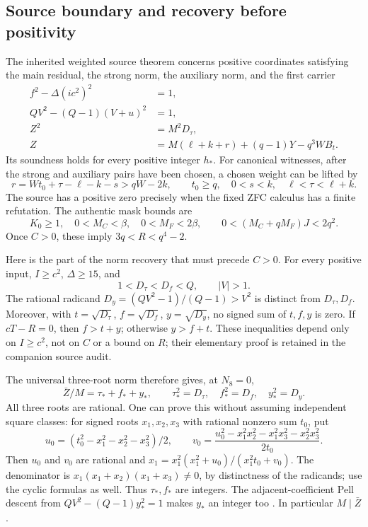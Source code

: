\subsection{Source boundary and recovery before positivity}

The inherited weighted source theorem \cite{source70,joint} concerns
positive coordinates satisfying the main residual, the strong norm,
the auxiliary norm, and the first carrier
\begin{align*}
 f^2-\Delta(ic^2)^2&=1,\\
 QV^2-(Q-1)(V+u)^2&=1,\\
 Z^2&=M^2D_\tau,\\
 Z&=M(\ell+k+r)+(q-1)Y-q^3WB_t.
\end{align*}
Its soundness holds for every positive integer $h_*$.  For canonical
witnesses, after the strong and auxiliary pairs have been chosen, a
chosen weight can be lifted by
\[
 r=Wt_0+\tau-\ell-k-s>qW-2k,
 \qquad t_0\ge q,\quad 0<s<k,\quad \ell<\tau<\ell+k.
\]
The source has a positive zero precisely when the fixed ZFC calculus has
a finite refutation.  The authentic mask bounds are
\[
 K_0\ge1,\quad 0<M_C<\beta,\quad0<M_F<2\beta,
 \qquad 0<(M_C+qM_F)J<2q^2.
\]
Once $C>0$, these imply $3q<R<q^4-2$.

Here is the part of the norm recovery that must precede $C>0$.
For every positive input, $I\ge c^2$, $\Delta\ge15$, and
\[
 1<D_\tau<D_f<Q,\qquad |V|>1.
\]
The rational radicand
$D_y=(QV^2-1)/(Q-1)>V^2$ is distinct from $D_\tau,D_f$.
Moreover, with $t=\sqrt{D_\tau}$, $f=\sqrt{D_f}$,
$y=\sqrt{D_y}$, no signed sum of $t,f,y$ is zero.
If $cT-R=0$, then $f>t+y$; otherwise $y>f+t$.
These inequalities depend only on $I\ge c^2$, not on $C$ or a bound on
$R$; their elementary proof is retained in the companion source audit.

The universal three-root norm therefore gives, at $N_8=0$,
\begin{equation}
 \bar Z/M=\tau_*+f_*+y_*,\qquad
 \tau_*^2=D_\tau,\quad f_*^2=D_f,\quad y_*^2=D_y.
 \label{eq:budget-radical-recovery}
\end{equation}
All three roots are rational.  One can prove this without assuming
independent square classes: for signed roots $x_1,x_2,x_3$ with rational
nonzero sum $t_0$, put
\[
 u_0=(t_0^2-x_1^2-x_2^2-x_3^2)/2,
 \qquad
 v_0=\frac{u_0^2-x_1^2x_2^2-x_1^2x_3^2-x_2^2x_3^2}{2t_0}.
\]
Then $u_0$ and $v_0$ are rational and
$x_1=x_1^2(x_1^2+u_0)/(x_1^2t_0+v_0)$.
The denominator is $x_1(x_1+x_2)(x_1+x_3)\ne0$, by distinctness of
the radicands; use the cyclic formulas as well.
Thus $\tau_*,f_*$ are integers.  The adjacent-coefficient Pell descent
from $QV^2-(Q-1)y_*^2=1$ makes $y_*$ an integer too
\cite{joint}.  In particular $M\mid\bar Z$.

